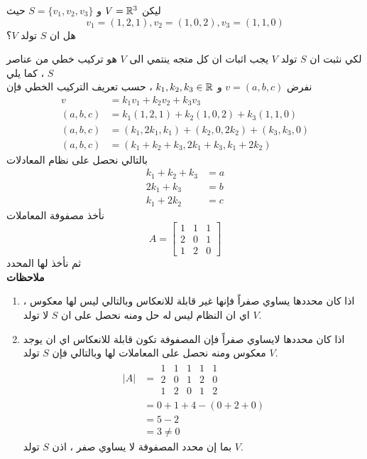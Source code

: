 \begin{example}
	ليكن $V = \mathbb{R}^3$ و $S = \{v_1, v_2, v_3\}$ حيث
	\[
	v_1 = (1,2,1), v_2=(1,0,2) , v_3 = (1,1,0)
	\]
	هل ان $S$ تولد $V$؟
\end{example}
\begin{solution}
	لكي نثبت ان $S$ تولد $V$ يجب اثبات ان كل متجه ينتمي الى $V$ هو تركيب خطي من عناصر $S$ ، كما يلي\\
	نفرض $v = (a,b,c)$ و $k_1,k_2,k_3\in \mathbb{R}$ ، حسب تعريف التركيب الخطي فإن
	\begin{align*}
		v &= k_1v_1 + k_2v_2 + k_3v_3\\
		(a,b,c) &=k_1(1,2,1) + k_2(1,0,2) + k_3(1,1,0)\\
		(a,b,c) &=(k_1,2k_1,k_1) + (k_2,0,2k_2) + (k_3,k_3,0)\\
		(a,b,c) &= (k_1+k_2+k_3, 2k_1+k_3, k_1+2k_2)
	\end{align*}
	بالتالي نحصل على نظام المعادلات
	\begin{align*}
		k_1 + k_2 + k_3 &= a\\
		2k_1+k_3 &= b\\
		k_1 + 2k_2 &= c
	\end{align*}
	نأخذ مصفوفة المعاملات
	\[
	A =
	\begin{bmatrix}
		1 & 1 & 1\\
		2 & 0 & 1\\
		1 & 2 & 0
	\end{bmatrix}
	\]
	ثم نأخذ لها المحدد\\
	\noindent
	\textbf{ملاحظات}
	\begin{enumerate}
		\item اذا كان محددها يساوي صفراً فإنها غير قابلة للانعكاس وبالتالي ليس لها معكوس ، اي ان النظام ليس له حل ومنه نحصل على ان $S$ لا تولد $V$.
		\item اذا كان محددها لايساوي صفراً فإن المصفوفة تكون قابلة للانعكاس اي ان يوجد معكوس ومنه نحصل على المعاملات لها وبالتالي فإن $S$ تولد $V$.
\begin{align*}
	|A| &=
	\begin{array}{|ccc|cc}
		1 & 1 & 1 & 1& 1\\
		2 & 0 & 1 & 2 & 0\\
		1 & 2 & 0 & 1 & 2
	\end{array}\\
	&= 0+1+4 - (0+2+0)\\
	&= 5 -2\\
	&= 3 \neq 0	
\end{align*}
بما إن محدد المصفوفة لا يساوي صفر ، اذن $S$ تولد $V$.
	\end{enumerate}
\end{solution}

